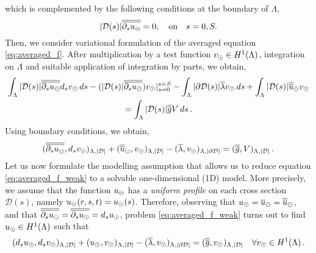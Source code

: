 which is complemented by the following conditions at the boundary of $\Lambda$,
\begin{equation}\label{eq:averaged_f_boundary}
|\D(s)| \avrd{\partial_s \uf}= 0, \quad \text{on} \quad s=0,S.
\end{equation}
Then, we consider variational formulation of the averaged equation \eqref{eq:averaged_f}.
After multiplication by a test function $v_{\odot} \in H^1(\Lambda)$, integration on $\Lambda$ and suitable application of integration by parts, we obtain,
\begin{multline*}
\int_\Lambda |\mathcal{D}(s)| \overline{\overline{\partial_s u_{\ominus}}} d_s v_{\odot} \, ds - (|\mathcal{D}(s)| \overline{\overline{\partial_s u_{\ominus}}}) v_{\odot} |_{s=0}^{s=S}- \int_\Lambda |\partial\mathcal{D}(s)| \overline{\lambda} v_{\odot} \, ds
+\int_\Lambda |\mathcal{D}(s)| \overline{\overline{u}}_\ominus v_{\odot} 
\\
= \int_\Lambda |\mathcal{D}(s)| \overline{\overline{g}} V\, ds\,.
\end{multline*}
Using boundary conditions, we obtain,
\begin{equation}\label{eq:averaged_f_weak}
  (\avrd{\partial_s \uf}, d_s \vd )_{\Lambda,|\D|} 
+ (\avrd{u}_\ominus, \vd)_{\Lambda, |\D|}
- (\avrc{\lambda},\vd)_{\Lambda,|\DD|}
= (\avrd{g},V)_{\Lambda,|\D|}\,.
\end{equation}
Let us now formulate the modelling assumption that allows us to reduce equation \eqref{eq:averaged_f_weak} to a solvable one-dimensional (1D) model.
More precisely, we assume that the function $u_{\ominus}$ has a \emph{uniform profile} on each cross section $\mathcal{D}(s)$, namely $u_{\ominus}(r,s,t) = u_{\odot}(s)$.
Therefore, observing that $u_{\odot}=\overline{u}_{\ominus}=\overline{\overline{u}}_{\ominus}$, 
and that $\overline{\overline{\partial_s u_{\ominus}}} = \overline{\overline{\partial_s u_{\odot}}} = d_s u_{\odot}$,
problem \eqref{eq:averaged_f_weak} turns out to find $u_{\odot} \in H^1(\Lambda)$ such that
\begin{equation}\label{eq:1Ddirneu_weak}
 (d_s \ud, d_s \vd)_{\Lambda,|\mathcal{D}|} 
+(\ud, \vd)_{\Lambda, |\D|}
-(\avrc{\lambda},\vd)_{\Lambda, |\DD|}
=  (\avrd{g},\vd)_{\Lambda, |\mathcal{D}|}
\quad \forall \vd \in H^1(\Lambda)\,.
\end{equation}

